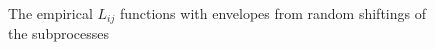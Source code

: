 \documentclass[12pt,a4paper,oneside,article]{memoir}
\begin{document}
\begin{figure}[htbp]
  \begin{adjustwidth}{-2in}{-2in}
	  \centering
  \end{adjustwidth}
  \caption{The empirical $L_{ij}$ functions with envelopes from random shiftings of the subprocesses}
  \label{fig:ioc}
\end{figure}
\end{document}
